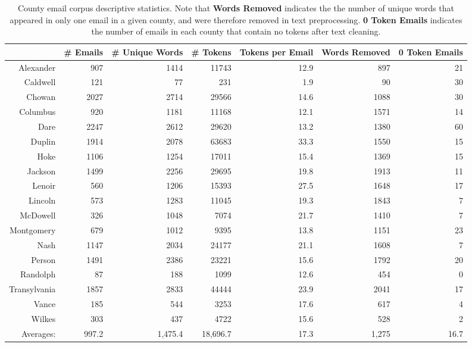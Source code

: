 \documentclass{pnastwo}
\begin{document}
\begin{article}
\begin{table*}[ht]
\centering
\begin{tabular}{rrrrrrr}
  \toprule
 & \# Emails & \# Unique Words & \# Tokens & Tokens per Email & Words Removed & 0 Token Emails \\ 
  \midrule
Alexander & 907 & 1414 & 11743 & 12.9 & 897 & 21 \\
\rowcolor{lred} 
  Caldwell & 121 & 77 & 231 & 1.9 & 90 & 30 \\ 
  Chowan & 2027 & 2714 & 29566 & 14.6 & 1088 & 30 \\ 
  Columbus & 920 & 1181 & 11168 & 12.1 & 1571 & 14 \\ 
  Dare & 2247 & 2612 & 29620 & 13.2 & 1380 & 60 \\ 
  Duplin & 1914 & 2078 & 63683 & 33.3 & 1550 & 15 \\ 
  Hoke & 1106 & 1254 & 17011 & 15.4 & 1369 & 15 \\ 
  Jackson & 1499 & 2256 & 29695 & 19.8 & 1913 & 11 \\ 
  Lenoir & 560 & 1206 & 15393 & 27.5 & 1648 & 17 \\ 
  Lincoln & 573 & 1283 & 11045 & 19.3 & 1843 & 7 \\ 
  McDowell & 326 & 1048 & 7074 & 21.7 & 1410 & 7 \\ 
  Montgomery & 679 & 1012 & 9395 & 13.8 & 1151 & 23 \\ 
  Nash & 1147 & 2034 & 24177 & 21.1 & 1608 & 7 \\ 
  Person & 1491 & 2386 & 23221 & 15.6 & 1792 & 20 \\ 
  \rowcolor{lred}
  Randolph & 87 & 188 & 1099 & 12.6 & 454 & 0 \\ 
  Transylvania & 1857 & 2833 & 44444 & 23.9 & 2041 & 17 \\ 
  Vance & 185 & 544 & 3253 & 17.6 & 617 & 4 \\ 
  Wilkes & 303 & 437 & 4722 & 15.6 & 528 & 2 \\ 
  \midrule
  Averages: & 997.2 &  1,475.4 & 18,696.7 & 17.3 & 1,275 & 16.7 \\
   \bottomrule
\end{tabular}
\caption{\label{tab:corpus desc stats} County email corpus descriptive statistics. Note that \textbf{Words Removed} indicates the the number of unique words that appeared in only one email in a given county, and were therefore removed in text preprocessing. \textbf{0 Token Emails} indicates the number of emails in each county that contain no tokens after text cleaning.}
\end{table*}



\end{article}
\end{document}
